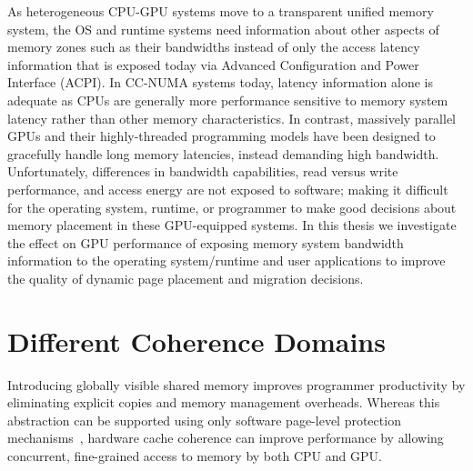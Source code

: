 As heterogeneous CPU-GPU systems move to a transparent unified memory system,
the OS and runtime systems need information about other aspects of memory zones
such as their bandwidths instead of only the access latency information that is
exposed today via Advanced Configuration and Power Interface (ACPI). In CC-NUMA
systems today, latency information alone is adequate as CPUs are generally more
performance sensitive to memory system latency rather than other memory
characteristics. In contrast, massively parallel GPUs and their highly-threaded
programming models have been designed to gracefully handle long memory
latencies, instead demanding high bandwidth. Unfortunately, differences in
bandwidth capabilities, read versus write performance, and access energy are not
exposed to software; making it difficult for the operating system, runtime, or
programmer to make good decisions about memory placement in these GPU-equipped
systems. In this thesis we investigate the effect on GPU performance of exposing
memory system bandwidth information to the operating system/runtime and user
applications to improve the quality of dynamic page placement and migration
decisions.

\section{Different Coherence Domains}
Introducing globally visible shared memory improves programmer productivity by
eliminating explicit copies and memory management overheads. Whereas this
abstraction can be supported using only software page-level protection
mechanisms~\cite{UVM, HSA}, hardware cache coherence can improve performance by
allowing concurrent, fine-grained access to memory by both CPU and GPU.

